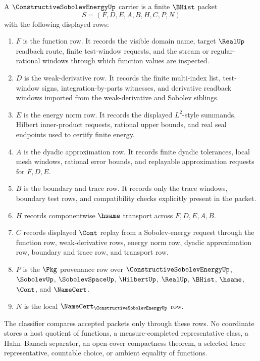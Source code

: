 \begin{definition}
\label{def:constructive-sobolev-energy-carrier}
A $\ConstructiveSobolevEnergyUp$ carrier is a finite $\BHist$ packet
$$
S=(F,D,E,A,B,H,C,P,N)
$$
with the following displayed rows:
\begin{enumerate}
\item $F$ is the function row. It records the visible domain name, target $\RealUp$ readback route, finite test-window requests, and the stream or regular-rational windows through which function values are inspected.
\item $D$ is the weak-derivative row. It records the finite multi-index list, test-window signs, integration-by-parts witnesses, and derivative readback windows imported from the weak-derivative and Sobolev siblings.
\item $E$ is the energy norm row. It records the displayed $L^2$-style summands, Hilbert inner-product requests, rational upper bounds, and real seal endpoints used to certify finite energy.
\item $A$ is the dyadic approximation row. It records finite dyadic tolerances, local mesh windows, rational error bounds, and replayable approximation requests for $F,D,E$.
\item $B$ is the boundary and trace row. It records only the trace windows, boundary test rows, and compatibility checks explicitly present in the packet.
\item $H$ records componentwise $\hsame$ transport across $F,D,E,A,B$.
\item $C$ records displayed $\Cont$ replay from a Sobolev-energy request through the function row, weak-derivative rows, energy norm row, dyadic approximation row, boundary and trace row, and transport row.
\item $P$ is the $\Pkg$ provenance row over $\ConstructiveSobolevEnergyUp$, $\SobolevUp$, $\SobolevSpaceUp$, $\HilbertUp$, $\RealUp$, $\BHist$, $\hsame$, $\Cont$, and $\NameCert$.
\item $N$ is the local $\NameCert_{\ConstructiveSobolevEnergyUp}$ row.
\end{enumerate}
The classifier compares accepted packets only through these rows. No coordinate stores a host quotient of functions, a measure-completed representative class, a Hahn--Banach separator, an open-cover compactness theorem, a selected trace representative, countable choice, or ambient equality of functions.
\end{definition}

